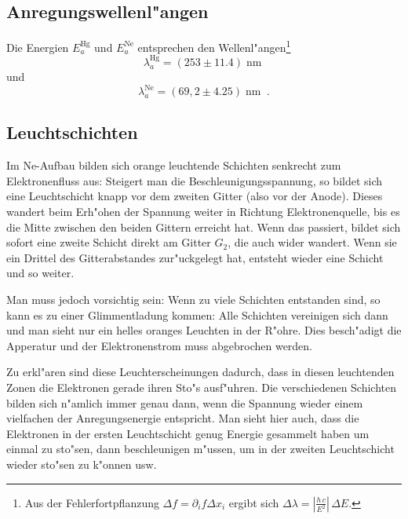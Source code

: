 \documentclass[a4paper,12pt]{article}
\begin{document}
\subsection*{Anregungswellenl"angen}
\label{sec:anregungswellenlangen}

Die Energien $E_a^\text{Hg}$ und $E_a^\text{Ne}$ entsprechen den
Wellenl"angen\footnote{Aus der Fehlerfortpflanzung $\Delta f
  = \partial_i f \Delta x_i$ ergibt sich $\Delta \lambda = \left |
    \frac{h\,c}{E^2} \right | \, \Delta E$.}
\begin{equation}
  \label{eq:6}
  \lambda_a^\text{Hg} = (253 \pm 11.4) \operatorname{nm}
\end{equation}
und
\begin{equation}
  \label{eq:7}
  \lambda_a^\text{Ne} = (69,2 \pm 4.25) \operatorname{nm} \;.
\end{equation}







\subsection*{Leuchtschichten}
\label{sec:leuchtschichten}


Im Ne-Aufbau bilden sich orange leuchtende Schichten senkrecht zum Elektronenfluss aus: Steigert man die Beschleunigungsspannung, so bildet sich eine Leuchtschicht knapp vor dem zweiten Gitter (also vor der Anode). Dieses wandert beim Erh"ohen der Spannung weiter in Richtung Elektronenquelle, bis es die Mitte zwischen den beiden Gittern erreicht hat. Wenn das passiert, bildet sich sofort eine zweite Schicht direkt am Gitter $G_2$, die auch wider wandert. Wenn sie ein Drittel des Gitterabstandes zur"uckgelegt hat, entsteht wieder eine Schicht und so weiter. 

Man muss jedoch vorsichtig sein: Wenn zu viele Schichten entstanden sind, so kann es zu einer Glimmentladung kommen: Alle Schichten vereinigen sich dann und man sieht nur ein helles oranges Leuchten in der R"ohre. Dies besch"adigt die Apperatur und der Elektronenstrom muss abgebrochen werden.

Zu erkl"aren sind diese Leuchterscheinungen dadurch, dass in diesen leuchtenden Zonen die Elektronen gerade ihren Sto"s ausf"uhren. Die verschiedenen Schichten bilden sich n"amlich immer genau dann, wenn die Spannung wieder einem vielfachen der Anregungsenergie entspricht. Man sieht hier auch, dass die Elektronen in der ersten Leuchtschicht genug Energie gesammelt haben um einmal zu sto"sen, dann beschleunigen m"ussen, um in der zweiten Leuchtschicht wieder sto"sen zu k"onnen usw.
\end{document}
